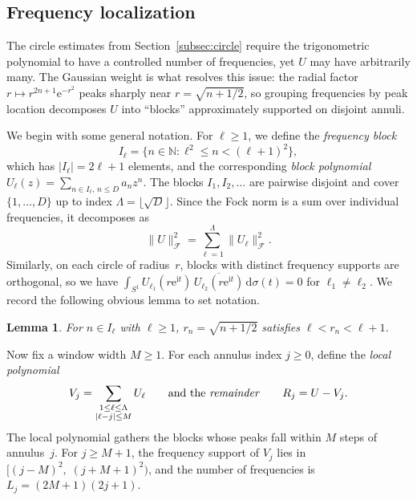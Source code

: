 \documentclass[11pt]{amsart}
\newtheorem{lemma}[theorem]{Lemma}
\theoremstyle{remark}
\begin{document}
\subsection{Frequency localization}\label{subsec:blocks}
The circle estimates from Section~\ref{subsec:circle} require the trigonometric
polynomial to have a controlled number of frequencies, yet $U$ may have
arbitrarily many.  The Gaussian weight is what  resolves this issue: the radial factor
$r \mapsto r^{2n+1}\mathrm{e}^{-r^2}$ peaks sharply near $r = \sqrt{n + 1/2}$,
so grouping frequencies by peak location decomposes $U$ into ``blocks''
approximately supported on disjoint annuli.
\medskip

We begin with some general notation. For $\ell \ge 1$, we define the \emph{frequency block}
\[
I_\ell = \bigl\{n \in \mathbb{N} : \ell^2 \le n < (\ell+1)^2\bigr\},
\]
which has $\lvert I_\ell \rvert = 2\ell+1$ elements, and the corresponding
\emph{block polynomial}
$U_\ell(z) = \sum_{n \in I_\ell,\, n \le D} a_n z^n$. The blocks $I_1, I_2, \dots$ are pairwise disjoint and cover
$\{1, \dots, D\}$ up to index $\Lambda = \lfloor\sqrt{D}\rfloor$.  Since the
Fock norm is a sum over individual frequencies, it decomposes as
\begin{equation}\label{eq:fock-decomp}
\lVert U \rVert_\mathcal{F}^2 = \sum_{\ell=1}^{\Lambda} \lVert U_\ell \rVert_\mathcal{F}^2.
\end{equation}
Similarly, on each circle of radius~$r$, blocks with distinct frequency
supports are orthogonal, so we have
$\int_{S^1} U_{\ell_1}(r\mathrm{e}^{\mathrm{i} t})\,
\overline{U_{\ell_2}(r\mathrm{e}^{\mathrm{i} t})}\,\mathrm{d}\sigma(t) = 0$
for $\ell_1 \ne \ell_2$.  We record the following obvious lemma to set notation.

\begin{lemma}\label{lem:peak}
For $n \in I_\ell$ with $\ell \ge 1$, 
$r_n = \sqrt{n + 1/2}$ satisfies $\ell < r_n < \ell + 1$.
\end{lemma}

Now fix a window width $M \ge 1$.  For each annulus index $j \ge 0$, define the
\emph{local polynomial}
\[
V_j = \sum_{\substack{1 \le \ell \le \Lambda \\ \lvert \ell - j \rvert \le M}} U_\ell
\qquad\text{and the \emph{remainder}}\qquad
R_j = U - V_j.
\]
The local polynomial gathers the blocks whose peaks fall within $M$ steps of
annulus~$j$. For $j \ge M + 1$, the frequency support of $V_j$ lies in
$[(j{-}M)^2,\; (j{+}M{+}1)^2)$, and the number of frequencies is
$L_j = (2M{+}1)(2j{+}1)$.
\medskip
\end{document}
